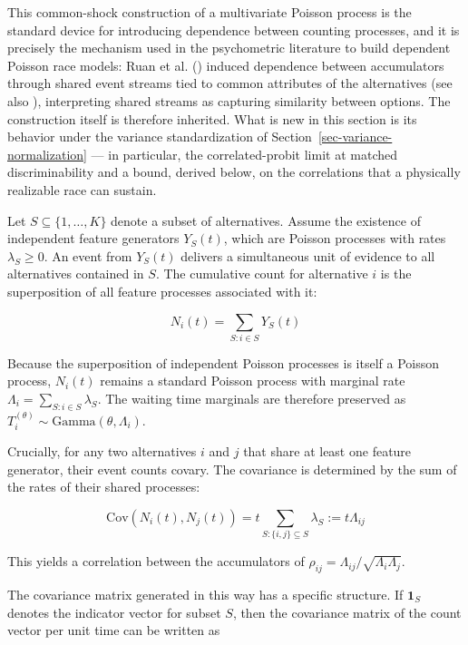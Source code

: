 \documentclass[
  man,
  floatsintext,
  longtable,
  a4paper,
  nolmodern,
  notxfonts,
  notimes,
  colorlinks=true,linkcolor=blue,citecolor=blue,urlcolor=blue]{apa7}
\begin{document}
This common-shock construction of a multivariate Poisson process is the
standard device for introducing dependence between counting processes,
and it is precisely the mechanism used in the psychometric literature to
build dependent Poisson race models: Ruan et al.
() induced dependence
between accumulators through shared event streams tied to common
attributes of the alternatives (see also
), interpreting shared streams as capturing similarity
between options. The construction itself is therefore inherited. What is
new in this section is its behavior under the variance standardization
of Section~\ref{sec-variance-normalization} --- in particular, the
correlated-probit limit at matched discriminability and a bound, derived
below, on the correlations that a physically realizable race can
sustain.

Let \(S \subseteq \{1, \dots, K\}\) denote a subset of alternatives.
Assume the existence of independent feature generators \(Y_S(t)\), which
are Poisson processes with rates \(\lambda_S \ge 0\). An event from
\(Y_S(t)\) delivers a simultaneous unit of evidence to all alternatives
contained in \(S\). The cumulative count for alternative \(i\) is the
superposition of all feature processes associated with it:

\[N_i(t) = \sum_{S: i \in S} Y_S(t)\]

Because the superposition of independent Poisson processes is itself a
Poisson process, \(N_i(t)\) remains a standard Poisson process with
marginal rate \(\Lambda_i = \sum_{S: i \in S} \lambda_S\). The waiting
time marginals are therefore preserved as
\(T_i^{(\theta)} \sim \text{Gamma}(\theta, \Lambda_i)\).

Crucially, for any two alternatives \(i\) and \(j\) that share at least
one feature generator, their event counts covary. The covariance is
determined by the sum of the rates of their shared processes:

\[\text{Cov}(N_i(t), N_j(t)) = t \sum_{S: \{i,j\} \subseteq S} \lambda_S := t \Lambda_{ij}\]

This yields a correlation between the accumulators of
\(\rho_{ij} = \Lambda_{ij} / \sqrt{\Lambda_i \Lambda_j}\).

The covariance matrix generated in this way has a specific structure. If
\(\mathbf{1}_S\) denotes the indicator vector for subset \(S\), then the
covariance matrix of the count vector per unit time can be written as
\end{document}
